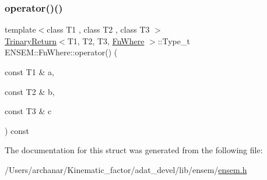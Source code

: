 \mbox{\label{structENSEM_1_1FnWhere_a8aeb5ef42051b473191ace0a8ae74304}} 
\subsubsection{\texorpdfstring{operator()()}{operator()()}\hspace{0.1cm}{\footnotesize\ttfamily [2/2]}}
{\footnotesize\ttfamily template$<$class T1 , class T2 , class T3 $>$ \\
\mbox{\hyperlink{structENSEM_1_1TrinaryReturn}{Trinary\+Return}}$<$T1, T2, T3, \mbox{\hyperlink{structENSEM_1_1FnWhere}{Fn\+Where}} $>$\+::Type\+\_\+t E\+N\+S\+E\+M\+::\+Fn\+Where\+::operator() (\begin{DoxyParamCaption}\item[{const T1 \&}]{a,  }\item[{const T2 \&}]{b,  }\item[{const T3 \&}]{c }\end{DoxyParamCaption}) const\hspace{0.3cm}{\ttfamily [inline]}}



The documentation for this struct was generated from the following file\+:\begin{DoxyCompactItemize}
\item 
/\+Users/archanar/\+Kinematic\+\_\+factor/adat\+\_\+devel/lib/ensem/\mbox{\hyperlink{lib_2ensem_2ensem_8h}{ensem.\+h}}\end{DoxyCompactItemize}
